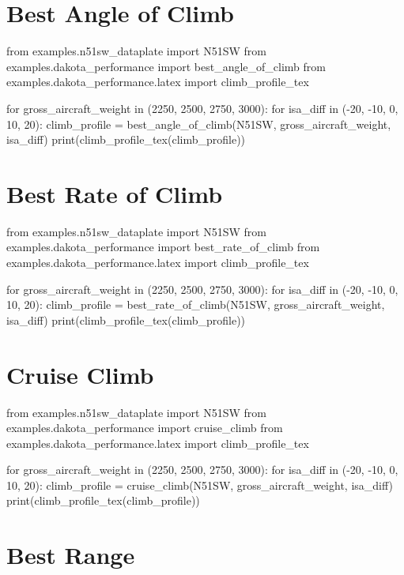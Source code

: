 \section{Best Angle of Climb}

\begin{pycode}
from examples.n51sw_dataplate import N51SW
from examples.dakota_performance import best_angle_of_climb
from examples.dakota_performance.latex import climb_profile_tex

for gross_aircraft_weight in (2250, 2500, 2750, 3000):
    for isa_diff in (-20, -10, 0, 10, 20):
        climb_profile = best_angle_of_climb(N51SW, gross_aircraft_weight, isa_diff)
        print(climb_profile_tex(climb_profile))
\end{pycode}

\section{Best Rate of Climb}

\begin{pycode}
from examples.n51sw_dataplate import N51SW
from examples.dakota_performance import best_rate_of_climb
from examples.dakota_performance.latex import climb_profile_tex

for gross_aircraft_weight in (2250, 2500, 2750, 3000):
    for isa_diff in (-20, -10, 0, 10, 20):
        climb_profile = best_rate_of_climb(N51SW, gross_aircraft_weight, isa_diff)
        print(climb_profile_tex(climb_profile))
\end{pycode}

\section{Cruise Climb}

\begin{pycode}
from examples.n51sw_dataplate import N51SW
from examples.dakota_performance import cruise_climb
from examples.dakota_performance.latex import climb_profile_tex

for gross_aircraft_weight in (2250, 2500, 2750, 3000):
    for isa_diff in (-20, -10, 0, 10, 20):
        climb_profile = cruise_climb(N51SW, gross_aircraft_weight, isa_diff)
        print(climb_profile_tex(climb_profile))
\end{pycode}

\section{Best Range}

